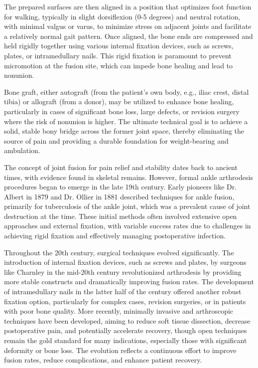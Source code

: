 The prepared surfaces are then aligned in a position that optimizes foot function for walking, typically in slight dorsiflexion (0-5 degrees) and neutral rotation, with minimal valgus or varus, to minimize stress on adjacent joints and facilitate a relatively normal gait pattern. Once aligned, the bone ends are compressed and held rigidly together using various internal fixation devices, such as screws, plates, or intramedullary nails. This rigid fixation is paramount to prevent micromotion at the fusion site, which can impede bone healing and lead to nonunion. 

Bone graft, either autograft (from the patient's own body, e.g., iliac crest, distal tibia) or allograft (from a donor), may be utilized to enhance bone healing, particularly in cases of significant bone loss, large defects, or revision surgery where the risk of nonunion is higher. The ultimate technical goal is to achieve a solid, stable bony bridge across the former joint space, thereby eliminating the source of pain and providing a durable foundation for weight-bearing and ambulation.

The concept of joint fusion for pain relief and stability dates back to ancient times, with evidence found in skeletal remains. However, formal ankle arthrodesis procedures began to emerge in the late 19th century. Early pioneers like Dr. Albert in 1879 and Dr. Ollier in 1881 described techniques for ankle fusion, primarily for tuberculosis of the ankle joint, which was a prevalent cause of joint destruction at the time. These initial methods often involved extensive open approaches and external fixation, with variable success rates due to challenges in achieving rigid fixation and effectively managing postoperative infection.

Throughout the 20th century, surgical techniques evolved significantly. The introduction of internal fixation devices, such as screws and plates, by surgeons like Charnley in the mid-20th century revolutionized arthrodesis by providing more stable constructs and dramatically improving fusion rates. The development of intramedullary nails in the latter half of the century offered another robust fixation option, particularly for complex cases, revision surgeries, or in patients with poor bone quality. More recently, minimally invasive and arthroscopic techniques have been developed, aiming to reduce soft tissue dissection, decrease postoperative pain, and potentially accelerate recovery, though open techniques remain the gold standard for many indications, especially those with significant deformity or bone loss. The evolution reflects a continuous effort to improve fusion rates, reduce complications, and enhance patient recovery.

